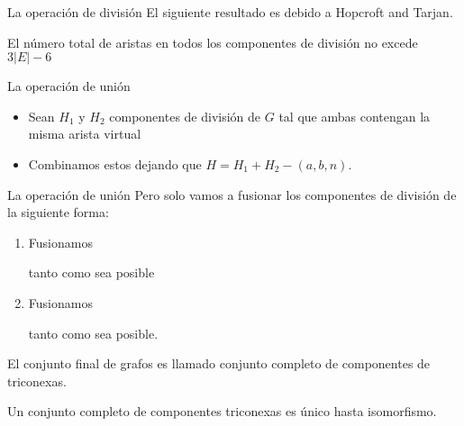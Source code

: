 \documentclass[spanish]{beamer}
\begin{document}
\begin{frame}{La operación de división}
  El siguiente resultado es debido a Hopcroft and Tarjan.
  \begin{lemma}
   El número total de aristas en todos los componentes de división no excede $3|E| - 6$
  \end{lemma}
\end{frame}

\begin{frame}{La operación de unión}
	\begin{itemize}
	\item Sean $H_{1}$ y $H_{2}$ componentes de división de $G$ tal que ambas contengan la misma arista virtual 
	\item Combinamos estos dejando que $H = H_{1} + H_{2} - (a, b, n)$. 
	\end{itemize}
\end{frame}

\begin{frame}{La operación de unión}
	Pero solo vamos a fusionar  los componentes de división de la siguiente forma:
	\begin{enumerate}
		\item Fusionamos  tanto como sea posible
	 	\item Fusionamos  tanto como sea posible.
		\end{enumerate}
	 El conjunto final de grafos es llamado conjunto completo de componentes de triconexas.
\end{frame}

\begin{frame}{}
  \begin{lemma}
   Un conjunto completo de componentes triconexas es único hasta isomorfismo.
  \end{lemma}
\end{frame}
\end{document}
